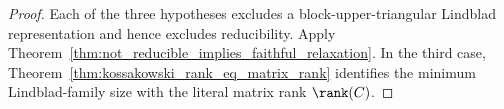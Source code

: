 \begin{proof}\leanok
    Each of the three hypotheses excludes a block-upper-triangular Lindblad
    representation and hence excludes reducibility.  Apply
    Theorem~\ref{thm:not_reducible_implies_faithful_relaxation}.  In the third
    case, Theorem~\ref{thm:kossakowski_rank_eq_matrix_rank} identifies the
    minimum Lindblad-family size with the literal matrix rank $\rank(C)$.
\end{proof}
